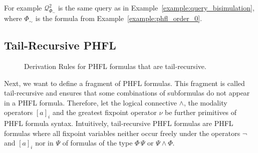 For example $\mathcal{Q}^2_{\Phi_\sim}$ is the same query as in Example~\ref{example:query_bisimulation}, where
$\Phi_\sim$ is the formula from Example~\ref{example:phfl_order_0}.

\subsection{Tail-Recursive PHFL}\label{subsec:tail-recursivePhfl}


\begin{figure}
    \caption{Derivation Rules for PHFL formulas that are tail-recursive.}
    \label{figure:phfl-tail-recursive}
\end{figure}

Next, we want to define a fragment of PHFL formulas. This fragment is called tail-recursive and ensures that
some combinations of subformulas do not appear in a PHFL formula. Therefore, let the logical connective
$\wedge$, the modality operators $[a]_i$ and the greatest fixpoint operator $\nu$ be further primitives of PHFL formula
syntax. Intuitively, tail-recursive PHFL formulas are PHFL formulas where all fixpoint variables neither occur freely
under the operators $\neg$ and $[a]_i$ nor in $\Psi$ of formulas of the type $\Phi\,\Psi$ or $\Psi \wedge \Phi$.

